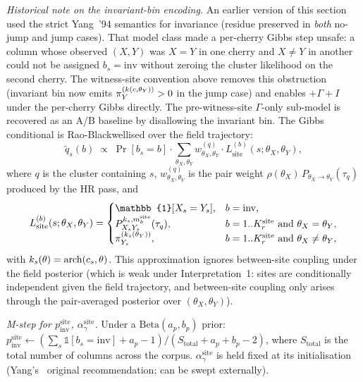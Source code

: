 \emph{Historical note on the invariant-bin encoding.} An earlier
version of this section used the strict Yang~'94 semantics for
invariance (residue preserved in \emph{both} no-jump and jump cases).
That model class made a per-cherry Gibbs step unsafe: a column whose
observed $(X, Y)$ was $X = Y$ in one cherry and $X \neq Y$ in another
could not be assigned $b_s = \mathrm{inv}$ without zeroing the cluster
likelihood on the second cherry. The witness-site convention above
removes this obstruction (invariant bin now emits
$\pi^{(k(c, \theta_Y))}_Y > 0$ in the jump case) and enables
$+\Gamma + I$ under the per-cherry Gibbs directly. The pre-witness-site
$\Gamma$-only sub-model is recovered as an A/B baseline by disallowing
the invariant bin.
%
The Gibbs conditional is Rao-Blackwellised over the field
trajectory:
\begin{equation}
  \tilde q_s(b) \;\propto\; \Pr[b_s = b] \cdot
    \!\!\sum_{\theta_X, \theta_Y}\!\!
       w^{(q)}_{\theta_X,\theta_Y}
       \cdot L^{(b)}_{\text{site}}(s; \theta_X, \theta_Y),
  \label{eq:arch-persite-Gibbs}
\end{equation}
where $q$ is the cluster containing $s$,
$w^{(q)}_{\theta_X, \theta_Y}$ is the pair weight
$\rho(\theta_X)\,P_{\theta_X \to \theta_Y}(\tau_q)$ produced by the
HR pass, and
\[
  L^{(b)}_{\text{site}}(s; \theta_X, \theta_Y) =
    \begin{cases}
      \mathbb{1}[X_s = Y_s], & b = \mathrm{inv},\\
      P^{k_s, m^{\mathrm{site}}_b}_{X_s Y_s}(\tau_q),
        & b = 1..K_r^{\mathrm{site}} \text{ and } \theta_X = \theta_Y,\\
      \eqm^{(k_s(\theta_Y))}_{Y_s},
        & b = 1..K_r^{\mathrm{site}} \text{ and } \theta_X \neq \theta_Y,
    \end{cases}
\]
with $k_s(\theta) = \mathrm{arch}(c_s, \theta)$. This
approximation ignores between-site coupling under the field
posterior (which is weak under Interpretation~1: sites are
conditionally independent given the field trajectory, and
between-site coupling only arises through the pair-averaged
posterior over $(\theta_X, \theta_Y)$).

\emph{M-step for $p^{\mathrm{site}}_{\mathrm{inv}}$,
$\alpha^{\mathrm{site}}_\gamma$.} Under a $\mathrm{Beta}(a_p, b_p)$
prior:
$p^{\mathrm{site}}_{\mathrm{inv}} \leftarrow
(\sum_s \mathbb{1}[b_s = \mathrm{inv}] + a_p - 1) /
(S_{\text{total}} + a_p + b_p - 2)$,
where $S_{\text{total}}$ is the total number of columns across the
corpus. $\alpha^{\mathrm{site}}_\gamma$ is held fixed at its
initialisation (Yang's~\citeyearpar{yang1996among} original
recommendation; can be swept externally).

